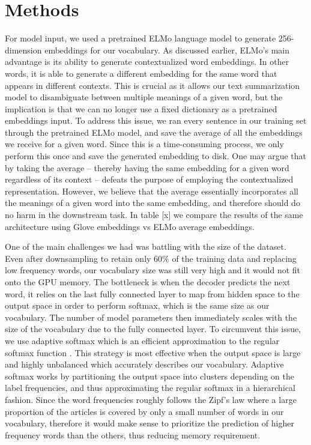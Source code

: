 \section{Methods}
\label{sec: method}



For model input, we used a pretrained ELMo language model \cite{peters2018deep} to generate 256-dimension embeddings for our vocabulary. As discussed earlier, ELMo's main advantage is its ability to generate contextualized word embeddings. In other words, it is able to generate a different embedding for the same word that appears in different contexts. This is crucial as it allows our text summarization model to disambiguate between multiple meanings of a given word, but the implication is that we can no longer use a fixed dictionary as a pretrained embeddings input. To address this issue, we ran every sentence in our training set through the pretrained ELMo model, and save the average of all the embeddings we receive for a given word. Since this is a time-consuming process, we only perform this once and save the generated embedding to disk. One may argue that by taking the average -- thereby having the same embedding for a given word regardless of its context -- defeats the purpose of employing the contextualized representation. However, we believe that the average essentially incorporates all the meanings of a given word into the same embedding, and therefore should do no harm in the downstream task.  In table [x]  we compare the results of the same architecture using Glove embeddings vs ELMo average embeddings. 

One of the main challenges we had was battling with the size of the dataset. Even after downsampling to retain only $60\%$ of the training data and replacing low frequency words, our vocabulary size was still very high and it would not fit onto the GPU memory. The bottleneck is when the decoder predicts the next word, it relies on the last fully connected layer to map from hidden space to the output space in order to perform softmax, which is the same size as our vocabulary. The number of model parameters then immediately scales with the size of the vocabulary due to the fully connected layer. To circumvent this issue, we use adaptive softmax which is an efficient approximation to the regular softmax function \cite{grave2016efficient}. This strategy is most effective when the output space is large and highly unbalanced which accurately describes our vocabulary. Adaptive softmax works by partitioning the output space into clusters depending on the label frequencies, and thus approximating the regular softmax in a hierarchical fashion. Since the word frequencies roughly follows the Zipf's law \cite{wilson1949human} where a large proportion of the articles is covered by only a small number of words in our vocabulary, therefore it would make sense to prioritize the prediction of higher frequency words than the others, thus reducing memory requirement.


